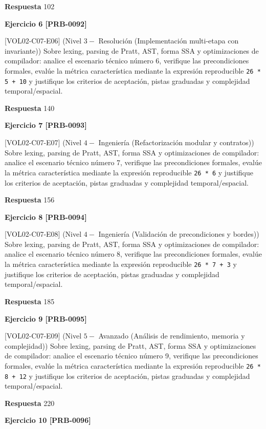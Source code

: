 \documentclass{book}
\begin{document}
\noindent\textbf{Respuesta} 102

\noindent\textbf{Ejercicio 6 [PRB-0092]}

[VOL02-C07-E06] (Nivel \(3 -\) Resolución (Implementación multi-etapa con invariante)) Sobre lexing, parsing de Pratt, AST, forma SSA y optimizaciones de compilador: analice el escenario técnico número 6, verifique las precondiciones formales, evalúe la métrica característica mediante la expresión reproducible \texttt{26 * 5 + 10} y justifique los criterios de aceptación, pistas graduadas y complejidad temporal/espacial.

\noindent\textbf{Respuesta} 140

\noindent\textbf{Ejercicio 7 [PRB-0093]}

[VOL02-C07-E07] (Nivel \(4 -\) Ingeniería (Refactorización modular y contratos)) Sobre lexing, parsing de Pratt, AST, forma SSA y optimizaciones de compilador: analice el escenario técnico número 7, verifique las precondiciones formales, evalúe la métrica característica mediante la expresión reproducible \texttt{26 * 6} y justifique los criterios de aceptación, pistas graduadas y complejidad temporal/espacial.

\noindent\textbf{Respuesta} 156

\noindent\textbf{Ejercicio 8 [PRB-0094]}

[VOL02-C07-E08] (Nivel \(4 -\) Ingeniería (Validación de precondiciones y bordes)) Sobre lexing, parsing de Pratt, AST, forma SSA y optimizaciones de compilador: analice el escenario técnico número 8, verifique las precondiciones formales, evalúe la métrica característica mediante la expresión reproducible \texttt{26 * 7 + 3} y justifique los criterios de aceptación, pistas graduadas y complejidad temporal/espacial.

\noindent\textbf{Respuesta} 185

\noindent\textbf{Ejercicio 9 [PRB-0095]}

[VOL02-C07-E09] (Nivel \(5 -\) Avanzado (Análisis de rendimiento, memoria y complejidad)) Sobre lexing, parsing de Pratt, AST, forma SSA y optimizaciones de compilador: analice el escenario técnico número 9, verifique las precondiciones formales, evalúe la métrica característica mediante la expresión reproducible \texttt{26 * 8 + 12} y justifique los criterios de aceptación, pistas graduadas y complejidad temporal/espacial.

\noindent\textbf{Respuesta} 220

\noindent\textbf{Ejercicio 10 [PRB-0096]}
\end{document}

